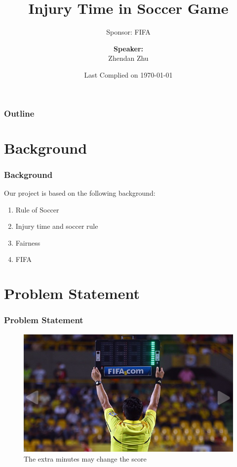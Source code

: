 \documentclass[compress,handout,10pt]{beamer}
\title{{\color{blue} \LARGE  Injury Time in Soccer Game\newline} }
\subtitle{{\color{red} \large Sponsor: FIFA} }
\author{ 
    {\bf{Speaker:}} \\ 
Zhendan Zhu \\ 
    \vspace{5pt}
}
\institute{JHU AMS 2012 FALL}
\date{\mygreen Last Complied on \today}
\let\olditem\item
\renewcommand{\item}{\setlength{\itemsep}{0.5\baselineskip}\olditem}
\begin{document}
\begin{frame}[plain]
    \titlepage
\end{frame}

\begin{frame}
    \frametitle{Outline}
    \tableofcontents
\end{frame}

\section{Background}

\begin{frame}
    \frametitle{Background}
    Our project is based on the following background:
    \vspace{7pt}
             \begin{enumerate}
                 \item Rule of Soccer
                 \item Injury time and soccer rule
                 \item Fairness
                 \item FIFA
             \end{enumerate}
\end{frame}


\section{Problem Statement}

\begin{frame}
    \frametitle{Problem Statement}
     \begin{figure}[h]
       \begin{center}
        \includegraphics[scale=0.4]{injurytime.png}
    \end{center}
    \caption{The extra minutes may change the score}
    \label{fig:branch}
\end{figure}
\end{frame}
\end{document}
